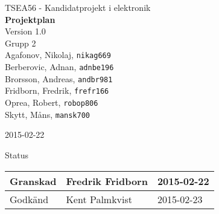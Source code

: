 \documentclass[11pt]{article}
\date{}
\begin{document}
\begin{titlepage}
\begin{center}
TSEA56 - Kandidatprojekt i elektronik \\[0.5in]
{\Large\bfseries Projektplan}\\
%
\vspace{4\baselineskip}
%
Version 1.0\\
\vspace{2\baselineskip}
%
Grupp 2 \\
Agafonov, Nikolaj, 
\texttt{nikag669}
\\
Berberovic, Adnan, 
\texttt{adnbe196}
\\
Brorsson, Andreas, 
\texttt{andbr981}
\\
Fridborn, Fredrik, 
\texttt{frefr166}
\\
Oprea, Robert, 
\texttt{robop806}
\\
Skytt, Måns, 
\texttt{mansk700}

\vspace{2\baselineskip}
2015-02-22

\vspace{19\baselineskip}
Status
\begin{longtable}{|l|l|l|} \hline

Granskad &
Fredrik Fridborn & 
2015-02-22 \\ \hline
Godkänd &
Kent Palmkvist &
2015-02-23 \\ \hline
 
\end{longtable}

\end{center}
\end{titlepage}
\end{document}
